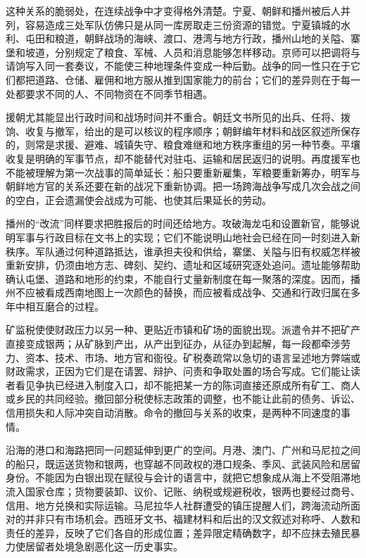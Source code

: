 这种关系的脆弱处，在连续战争中才变得格外清楚。宁夏、朝鲜和播州被后人并列，容易造成三处军队仿佛只是从同一库房取走三份资源的错觉。宁夏镇城的水利、屯田和粮道，朝鲜战场的海峡、渡口、港湾与地方行政，播州山地的关隘、寨堡和坡道，分别规定了粮食、军械、人员和消息能够怎样移动。京师可以把调将与请饷写入同一套奏议，不能使三种地理条件变成一种后勤。战争的同一性只在于它们都把道路、仓储、雇佣和地方服从推到国家能力的前台；它们的差异则在于每一处都要求不同的人、不同物资在不同季节相遇。

援朝尤其能显出行政时间和战场时间并不重合。朝廷文书所见的出兵、任将、拨饷、收复与撤军，给出的是可以核议的程序顺序；朝鲜编年材料和战区叙述所保存的，则常是求援、避难、城镇失守、粮食难继和地方秩序重组的另一种节奏。平壤收复是明确的军事节点，却不能替代对驻屯、运输和居民返归的说明。再度援军也不能被理解为第一次战事的简单延长：船只要重新雇集，军粮要重新筹办，明军与朝鲜地方官的关系还要在新的战况下重新协调。把一场跨海战争写成几次会战之间的空白，正会遗漏使会战成为可能、也使其后果延长的劳动。

播州的“改流”同样要求把胜报后的时间还给地方。攻破海龙屯和设置新官，能够说明军事与行政目标在文书上的实现；它们不能说明山地社会已经在同一时刻进入新秩序。军队通过何种道路抵达，谁承担夫役和供给，寨堡、关隘与旧有权威怎样被重新安排，仍须由地方志、碑刻、契约、遗址和区域研究逐处追问。遗址能够帮助确认屯堡、道路和地形的约束，不能自行丈量新制度在每一聚落的深度。因而，播州不应被看成西南地图上一次颜色的替换，而应被看成战争、交通和行政归属在多年中相互磨合的过程。

矿监税使使财政压力以另一种、更贴近市镇和矿场的面貌出现。派遣令并不把矿产直接变成银两；从矿脉到产出，从产出到征办，从征办到起解，每一段都牵涉劳力、资本、技术、市场、地方官和衙役。矿税奏疏常以急切的语言呈述地方弊端或财政需求，正因为它们是在请罢、辩护、问责和争取处置的场合写成。它们能让读者看见争执已经进入制度入口，却不能把某一方的陈词直接还原成所有矿工、商人或乡民的共同经验。撤回部分税使标志政策的调整，也不能让此前的债务、诉讼、信用损失和人际冲突自动消散。命令的撤回与关系的收束，是两种不同速度的事情。

沿海的港口和海路把同一问题延伸到更广的空间。月港、澳门、广州和马尼拉之间的船只，既运送货物和银两，也穿越不同政权的港口规条、季风、武装风险和居留身份。不能因为白银出现在赋役与会计的语言中，就把它想象成从海上不受阻滞地流入国家仓库；货物要装卸、议价、记账、纳税或规避税收，银两也要经过商号、信用、地方兑换和实际运输。马尼拉华人社群遭受的镇压提醒人们，跨海流动所面对的并非只有市场机会。西班牙文书、福建材料和后出的汉文叙述对称呼、人数和责任的差异，反映了它们各自的形成位置；差异限定精确数字，却不应抹去殖民暴力使居留者处境急剧恶化这一历史事实。

